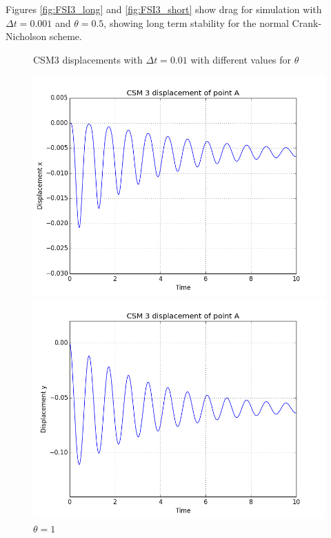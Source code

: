Figures \ref{fig:FSI3_long} and \ref{fig:FSI3_short} show drag for simulation with $\Delta t = 0.001$ and $\theta = 0.5$, showing long term stability for the normal Crank-Nicholson scheme.

\begin{figure}[H]  \label{fig:CSM3_dis_plots} 
   \caption {CSM3 displacements with $\Delta t = 0.01$ with different values for $\theta$}
  \begin{minipage}[b]{0.6\linewidth}
    \centering
    \includegraphics[scale=0.40]{./Temporal_stability/CSM3_implicit.png} 
    \caption{$\theta = 1 $} 
    \vspace{4ex}
  \end{minipage}%
  \begin{minipage}[b]{0.6\linewidth}
    \centering
    \includegraphics[scale=0.40]{./Temporal_stability/CSM3_implicit_y.png} 

\end{minipage}
\end{figure}

